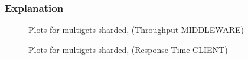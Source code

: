 \documentclass[11pt,a4paper]{article}
\begin{document}
\subsubsection{Explanation}

\begin{figure}[!h]
  \centering
    \caption{Plots for multigets sharded, (Throughput MIDDLEWARE)}
  \label{fig:multigets_sharded_mw_tp}
\end{figure}

\begin{figure}[!h]
  \centering
    \caption{Plots for multigets sharded, (Response Time CLIENT)}
  \label{fig:multigets_sharded_mt_rt}
\end{figure}
\end{document}
